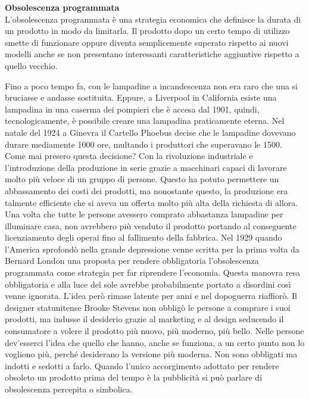 \documentclass[12pt]{book} %
\begin{document}
\noindent \textbf{\large Obsolescenza programmata} \\
L'obsolescenza programmata è una strategia economica che definisce la durata di un prodotto in modo
da limitarla. Il prodotto dopo un certo tempo di utilizzo smette di funzionare oppure diventa semplicemente superato
rispetto ai nuovi modelli anche se non presentano interessanti caratteristiche aggiuntive rispetto a quello vecchio.

Fino a poco tempo fa, con le lampadine a incandescenza non era raro che
una si bruciasse e andasse sostituita. Eppure, a Liverpool in California esiste una lampadina in una caserma dei
pompieri che è accesa dal 1901, quindi, tecnologicamente, è possibile creare una lampadina praticamente eterna. Nel
natale del 1924 a Ginevra il Cartello Phoebus decise che le lampadine dovevano durare mediamente 1000 ore, multando
i produttori che superavano le 1500. Come mai presero questa decisione? Con la rivoluzione industriale e
l'introduzione della produzione in serie grazie a macchinari capaci di lavorare molto più veloce
di un gruppo di persone. Questo ha potuto permettere un abbassamento dei costi dei prodotti, ma nonostante questo, la
produzione era talmente efficiente che si aveva un offerta molto più alta della richiesta di allora. 
Una volta che tutte le persone avessero comprato abbastanza lampadine per illuminare casa, non avrebbero più venduto il prodotto portando al
conseguente licenziamento degli operai fino al fallimento della fabbrica. 
Nel 1929 quando l'America sprofondò nella grande depressione venne scritta per la prima volta da Bernard London
una proposta per rendere obbligatoria l'obsolescenza programmata come strategia per far riprendere
l'economia. Questa manovra resa obbligatoria e alla luce del sole avrebbe probabilmente portato a
disordini così venne ignorata. L'idea però rimase latente per anni e nel dopoguerra riaffiorò. Il designer statunitense Brooke
Stevens non obbligò le persone a comprare i suoi prodotti, ma indusse il desiderio grazie al marketing e al design
seducendo il consumatore a volere il prodotto più nuovo, più moderno, più bello. Nelle persone
dev'esserci l'idea che quello che hanno, anche se funziona, a un certo punto
non lo vogliono più, perché desiderano la versione più moderna. Non sono obbligati ma indotti
e sedotti a farlo. Quando l'unico accorgimento adottato per rendere obsoleto un prodotto prima del tempo è la
pubblicità si può parlare di obsolescenza percepita o
simbolica.
\end{document}
